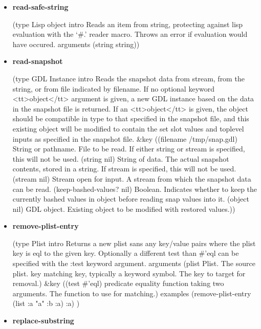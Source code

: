 \documentclass [11pt]{book}
\begin{document}
\begin{itemize}
\item {}
\label{prim:read-safe-string}
\textbf{read-safe-string}

(type Lisp object intro
  Reads an item from string, protecting against lisp evaluation with
the `\#.' reader macro. Throws an error if evaluation would have occured.
 arguments (string string))



\item {}
\label{prim:read-snapshot}
\textbf{read-snapshot}

(type GDL Instance intro
  Reads the snapshot data from stream, from the string,
or from file indicated by filename. If no optional keyword
<tt>object</tt> argument is given, a new GDL instance based on the
data in the snapshot file is returned. If an <tt>object</tt> is given,
the object should be compatible in type to that specified in the
snapshot file, and this existing object will be modified to contain
the set slot values and toplevel inputs as specified in the snapshot
file.
 \&key
 ((filename /tmp/snap.gdl)
  String or pathname. File to be read. If either string or stream is specified, this will not be used.
  (string nil)
  String of data. The actual snapshot contents, stored in a string. If stream is specified, this will not be used.
  (stream nil)
  Stream open for input. A stream from which the snapshot data can be read.
  (keep-bashed-values? nil)
  Boolean. Indicates whether to keep the currently bashed values in object before reading snap values into it.
  (object nil)
  GDL object. Existing object to be modified with restored values.))



\item {}
\label{prim:remove-plist-entry}
\textbf{remove-plist-entry}

(type Plist intro
  Returns a new plist sans any key/value pairs where the plist key is eql to the given key.
Optionally a different test than \#'eql can be specified with the :test keyword argument.
 arguments
 (plist Plist. The source plist. key
  matching key, typically a keyword symbol. The key to target for removal.)
 \&key
 ((test \#'eql)
  predicate equality function taking two arguments. The function to use for matching.)
 examples (remove-plist-entry (list :a "a" :b :a) :a) 
)



\item {}
\label{prim:replace-substring}
\textbf{replace-substring}


\end{itemize}
\end{document}
